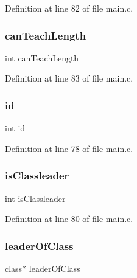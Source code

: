 Definition at line 82 of file main.\+c.

\hypertarget{structteacher_ac5f08fdd49a83d7053ba26b1c1c71e8a}{}\label{structteacher_ac5f08fdd49a83d7053ba26b1c1c71e8a} 
\subsubsection{\texorpdfstring{can\+Teach\+Length}{canTeachLength}}
{\footnotesize\ttfamily int can\+Teach\+Length}



Definition at line 83 of file main.\+c.

\hypertarget{structteacher_a7441ef0865bcb3db9b8064dd7375c1ea}{}\label{structteacher_a7441ef0865bcb3db9b8064dd7375c1ea} 
\subsubsection{\texorpdfstring{id}{id}}
{\footnotesize\ttfamily int id}



Definition at line 78 of file main.\+c.

\hypertarget{structteacher_a6120a3cee2c5bb1e10db23a543a20a8a}{}\label{structteacher_a6120a3cee2c5bb1e10db23a543a20a8a} 
\subsubsection{\texorpdfstring{is\+Classleader}{isClassleader}}
{\footnotesize\ttfamily int is\+Classleader}



Definition at line 80 of file main.\+c.

\hypertarget{structteacher_a7fcc02effcf952684962b4481e328964}{}\label{structteacher_a7fcc02effcf952684962b4481e328964} 
\subsubsection{\texorpdfstring{leader\+Of\+Class}{leaderOfClass}}
{\footnotesize\ttfamily \hyperlink{structclass}{class}$\ast$ leader\+Of\+Class}



